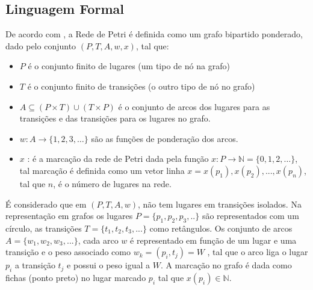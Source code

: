 \subsection{Linguagem Formal}
De acordo com \cite{peterson}, a Rede de Petri é definida como um grafo bipartido ponderado, dado pelo conjunto $(P,T,A,w,x)$, tal que:
\begin{itemize}
    \item $P$ é o conjunto finito de lugares (um tipo de nó na grafo)
    \item $T$ é o conjunto finito de transições (o outro tipo de nó no grafo)
    \item $A \subseteq (P \times T) \cup (T \times P)$ é o conjunto de arcos dos lugares para as transições e das transições para os lugares no grafo.
    \item  $w : A \rightarrow \{1, 2, 3, \ldots\}$ são as funções de ponderação dos arcos.
    \item $x$ : é a marcação da rede de Petri dada pela função $x : P \rightarrow \mathbb{N} = \{0, 1, 2, \ldots\}$, tal marcação é definida como um vetor linha $x = x(p_1), x(p_2), ..., x(p_n)$, tal que $n$, é o número de lugares na rede.
\end{itemize}
É considerado que em $(P,T,A,w)$, não tem lugares em transições isolados.
Na representação em grafos os lugares $P = \{p_1,p_2,p_3, ..\}$ são representados com um círculo, as transições $T = \{t_1,t_2,t_3,...\}$ como retângulos. Os conjunto de arcos $A = \{w_1,w_2,w_3,...\}$, cada arco $w$ é representado em função de um lugar e uma transição e o peso associado como $w_k= (p_i,t_j) = W$ , tal que o arco liga o lugar $p_i$ a transição $t_j$ e possui o peso igual a $W$. A marcação no grafo é dada como fichas (ponto preto) no lugar marcado $p_i$ tal que $x(p_i) \in \mathbb{N}$.


